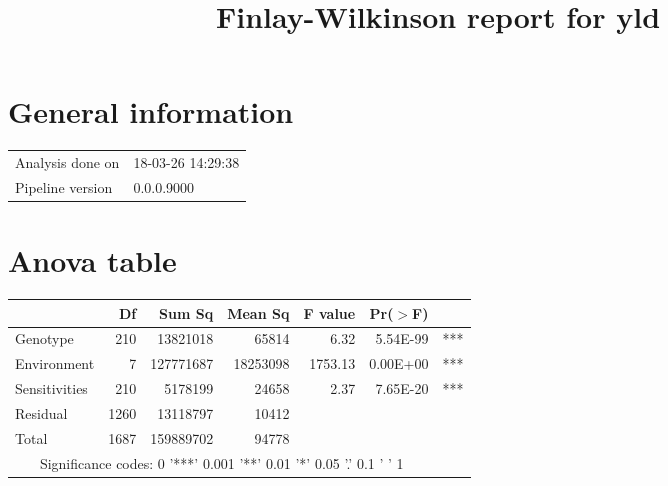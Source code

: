 \documentclass[a4paper,11pt]{article}\usepackage[]{graphicx}\usepackage[]{color}
\title{Finlay-Wilkinson report for yld}%
\author{\vspace{-5ex}}
\date{\vspace{-5ex}}
\begin{document}
\maketitle
\singlespacing

\section{General information}
\begin{table}[ht]
\begin{flushleft}
\begin{tabular}{ll}
  Analysis done on & 18-03-26 14:29:38 \\ 
  Pipeline version & 0.0.0.9000 \\ 
  \end{tabular}
\label{general}
\end{flushleft}
\end{table}


\section{Anova table}

\begin{table}[ht]
\begin{flushleft}
\begin{tabular}{lrrrrrl}
  \hline
 & Df & Sum Sq & Mean Sq & F value & Pr($>$F) &  \\ 
  \hline
Genotype & 210 & 13821018 & 65814 & 6.32 & 5.54E-99 & *** \\ 
  Environment & 7 & 127771687 & 18253098 & 1753.13 & 0.00E+00 & *** \\ 
  Sensitivities & 210 & 5178199 & 24658 & 2.37 & 7.65E-20 & *** \\ 
  Residual & 1260 & 13118797 & 10412 &  &  &  \\ 
  Total & 1687 & 159889702 & 94778 &  &  &  \\ 
   \hline  \multicolumn{6}{c}{Significance codes:  0 '***' 0.001 '**' 0.01 '*' 0.05 '.' 0.1 ' ' 1} \\ \hline
\end{tabular}
\label{anova}
\end{flushleft}
\end{table}
\end{document}
